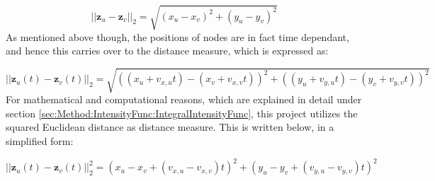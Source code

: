 \begin{equation}
    ||\textbf{z}_u - \textbf{z}_v||_2
    = 
    \sqrt{(x_u - x_v)^2 + (y_u - y_v)^2}
\end{equation}
As mentioned above though, the positions of nodes are in fact time dependant, and hence this carries over to the distance measure, which is expressed as:

\begin{equation}
    ||\textbf{z}_u(t) - \textbf{z}_v(t)||_2
    = 
    \sqrt{((x_u + v_{x,u}t) - (x_v + v_{x,v}t))^2 + ((y_u + v_{y,u}t) - (y_v + v_{y,v}t))^2}
\end{equation}
For mathematical and computational reasons, which are explained in detail under section \ref{sec:Method:IntensityFunc:IntegralIntensityFunc}, this project utilizes the squared Euclidean distance as distance measure.
This is written below, in a simplified form:

\begin{equation} 
||\textbf{z}_u(t) - \textbf{z}_v(t)||_2^2
= 
(x_u - x_v + (v_{x,u} - v_{x,v})t)^2 + (y_u - y_v + ( v_{y,u} - v_{y,v})t)^2
\label{eq:SquaredEuclideanDistance}
\end{equation}



